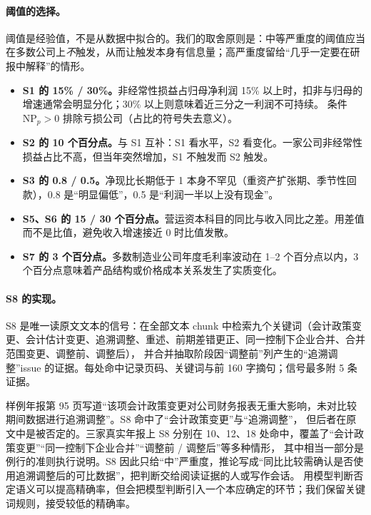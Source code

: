 \paragraph{阈值的选择。}
阈值是经验值，不是从数据中拟合的。我们的取舍原则是：中等严重度的阈值应当在多数公司上\emph{不}触发，从而让触发本身有信息量；高严重度留给“几乎一定要在研报中解释”的情形。
\begin{itemize}
\item \textbf{S1 的 15\% / 30\%。}非经常性损益占归母净利润 15\% 以上时，扣非与归母的增速通常会明显分化；30\% 以上则意味着近三分之一利润不可持续。
      条件 $\text{NP}_p>0$ 排除亏损公司（占比的符号失去意义）。
\item \textbf{S2 的 10 个百分点。}与 S1 互补：S1 看水平，S2 看变化。一家公司非经常性损益占比不高，但当年突然增加，S1 不触发而 S2 触发。
\item \textbf{S3 的 0.8 / 0.5。}净现比长期低于 1 本身不罕见（重资产扩张期、季节性回款），0.8 是“明显偏低”，0.5 是“利润一半以上没有现金”。
\item \textbf{S5、S6 的 15 / 30 个百分点。}营运资本科目的同比与收入同比之差。用差值而不是比值，避免收入增速接近 0 时比值发散。
\item \textbf{S7 的 3 个百分点。}多数制造业公司年度毛利率波动在 1--2 个百分点以内，3 个百分点意味着产品结构或价格成本关系发生了实质变化。
\end{itemize}

\paragraph{S8 的实现。}
S8 是唯一读原文文本的信号：在全部文本 chunk 中检索九个关键词（会计政策变更、会计估计变更、追溯调整、重述、前期差错更正、同一控制下企业合并、合并范围变更、调整前、调整后），
并合并抽取阶段因“调整前”列产生的“追溯调整”issue 的证据。每处命中记录页码、关键词与前 160 字摘句；信号最多附 5 条证据。

\begin{failcase}[：关键词检索不识别否定]
样例年报第 95 页写道“该项会计政策变更对公司财务报表无重大影响，未对比较期间数据进行追溯调整”。S8 命中了“会计政策变更”与“追溯调整”，
但后者在原文中是被否定的。三家真实年报上 S8 分别在 10、12、18 处命中，覆盖了“会计政策变更”“同一控制下企业合并”“调整前 / 调整后”等多种情形，
其中相当一部分是例行的准则执行说明。S8 因此只给“中”严重度，推论写成“同比比较需确认是否使用追溯调整后的可比数据”，把判断交给阅读证据的人或写作会话。
用模型判断否定语义可以提高精确率，但会把模型判断引入一个本应确定的环节；我们保留关键词规则，接受较低的精确率。
\end{failcase}

